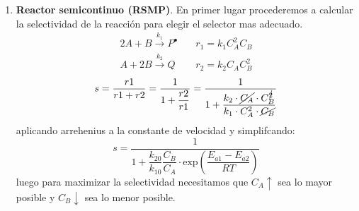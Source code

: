 \begin{enumerate}[label=\Roman*.]
\begin{itemize}
	      \end{itemize}


	\item \textbf{Reactor semicontinuo (RSMP)}.
	      \noindent En primer lugar procederemos a calcular la selectividad de la reacción para elegir el selector mas adecuado.
	      \begin{align*}
		      2A +B \xrightarrow{k_1} P^{\bullet} \quad & r_1 = k_1 C_A^2 C_B \\
		      A + 2B \xrightarrow{k_2} Q \quad          & r_2 = k_2 C_A C_B^2
	      \end{align*}
	      \begin{equation*}
		      s = \frac{r1}{r1+r2} = \frac{1}{1+\dfrac{r2}{r1}}= \frac{1}{1+\dfrac{k_2\cdot \cancel{C_A}\cdot C_B^{\cancel{2}}}{k_1\cdot C_A^2 \cdot \cancel{C_B}}}
	      \end{equation*}
	      aplicando arrehenius a la constante de velocidad y simplifcando:
	      \begin{equation}
		      s = \frac{1}{1+\dfrac{k_{20}}{k_{10}} \dfrac{C_B}{C_A}\cdot \text{exp}\left(\dfrac{E_{a1}-E_{a2}}{RT}\right)}
	      \end{equation}
	      luego para maximizar la selectividad necesitamos que $C_A \uparrow$ sea lo mayor posible y $C_B\downarrow$ sea lo menor posible.\\

	      \begin{center}
	      \end{center}


\end{enumerate}
